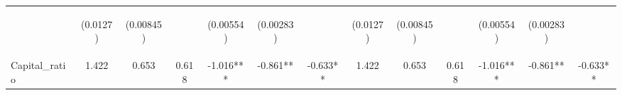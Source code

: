 \documentclass[]{article}
\begin{document}
\begin{center}
\begin{tabular}{lcccccccccccc}
\vspace{4pt} & \begin{footnotesize}(0.0127)\end{footnotesize} & \begin{footnotesize}(0.00845)\end{footnotesize} & \begin{footnotesize}\end{footnotesize} & \begin{footnotesize}(0.00554)\end{footnotesize} & \begin{footnotesize}(0.00283)\end{footnotesize} & \begin{footnotesize}\end{footnotesize} & \begin{footnotesize}(0.0127)\end{footnotesize} & \begin{footnotesize}(0.00845)\end{footnotesize} & \begin{footnotesize}\end{footnotesize} & \begin{footnotesize}(0.00554)\end{footnotesize} & \begin{footnotesize}(0.00283)\end{footnotesize} & \begin{footnotesize}\end{footnotesize} \\
Capital\_ratio & 1.422 & 0.653 & 0.618 & -1.016*** & -0.861** & -0.633** & 1.422 & 0.653 & 0.618 & -1.016*** & -0.861** & -0.633** \\

\end{tabular}
\end{center}
\end{document}
